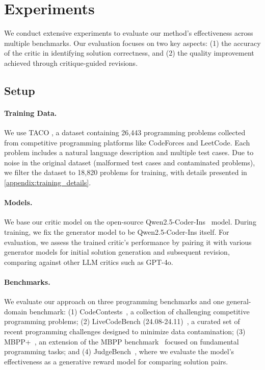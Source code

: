\section{Experiments}
We conduct extensive experiments to evaluate our method's effectiveness across multiple benchmarks.
Our evaluation focuses on two key aspects: (1) the accuracy of the critic in identifying solution correctness, and (2) the quality improvement achieved through critique-guided revisions.

\subsection{Setup}
\paragraph{Training Data.}
We use TACO \cite{li2023taco}, a dataset containing 26,443 programming problems collected from competitive programming platforms like CodeForces and LeetCode. Each problem includes a natural language description and multiple test cases.
Due to noise in the original dataset (malformed test cases and contaminated problems), we filter the dataset to 18,820 problems for training, with details presented in \cref{appendix:training_details}.

\paragraph{Models.}
We base our critic model on the open-source Qwen2.5-Coder-Ins~\cite{hui2024qwen2} model.
During training, we fix the generator model to be Qwen2.5-Coder-Ins itself.
For evaluation, we assess the trained critic's performance by pairing it with various generator models for initial solution generation and subsequent revision, comparing against other LLM critics such as GPT-4o.

\paragraph{Benchmarks.} We evaluate our approach on three programming benchmarks and one general-domain benchmark:
(1) CodeContests~\cite{li2022competition}, a collection of challenging competitive programming problems;
(2) LiveCodeBench (24.08-24.11)~\cite{jain2024livecodebench}, a curated set of recent programming challenges designed to minimize data contamination;
(3) MBPP+~\cite{liu2024your}, an extension of the MBPP benchmark~\cite{austin2021program} focused on fundamental programming tasks; and
(4) JudgeBench~\cite{tan2024judgebench}, where we evaluate the model's effectiveness as a generative reward model for comparing solution pairs.

